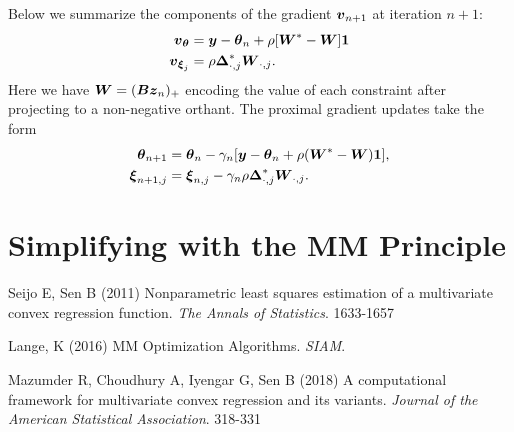 \documentclass{article}
\begin{document}
Below we summarize the components of the gradient \(\boldsymbol{v}_{n+1}\) at iteration \(n+1\):
\begin{align*}
    \boldsymbol{v}_{\boldsymbol{\theta}}
    &=
    \boldsymbol{y} - \boldsymbol{\theta}_{n} + \rho [\boldsymbol{W}^{\ast} - \boldsymbol{W}] \boldsymbol{1} \\
    \boldsymbol{v}_{\boldsymbol{\xi}_{j}}
    &=
    \rho \boldsymbol{\Delta}_{\cdot,j}^{\ast} \boldsymbol{W}_{\cdot,j}.
\end{align*}
Here we have \(\boldsymbol{W} = (\boldsymbol{B} \boldsymbol{z}_{n})_{+}\) encoding the value of each constraint after projecting to a non-negative orthant.
The proximal gradient updates take the form
\begin{align*}
    \boldsymbol{\theta}_{n+1}
    &=
    \boldsymbol{\theta}_{n}
    - \gamma_{n} [\boldsymbol{y} - \boldsymbol{\theta}_{n} + \rho (\boldsymbol{W}^{\ast} - \boldsymbol{W}) \boldsymbol{1}], \\
    \boldsymbol{\xi}_{n+1,j}
    &=
    \boldsymbol{\xi}_{n,j} - \gamma_{n} \rho \boldsymbol{\Delta}_{\cdot,j}^{\ast} \boldsymbol{W}_{\cdot,j}.
\end{align*}

\section*{\center Simplifying with the MM Principle}

\begin{thebibliography}{99}
    Seijo E, Sen B (2011) {Nonparametric least squares estimation of a multivariate convex regression function}. {\it The Annals of Statistics}. 1633-1657
    
    Lange, K (2016) {MM Optimization Algorithms}. {\it SIAM}.

    Mazumder R, Choudhury A, Iyengar G, Sen B (2018) {A computational framework for multivariate convex regression and its variants}. {\it Journal of the American Statistical Association}. 318-331
\end{thebibliography}
\end{document}
